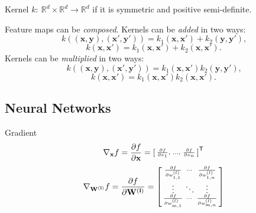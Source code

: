 \documentclass[a4paper,11pt]{article}
\def\R{\mathbb{R}}
\def\T{\mathsf{T}}
\begin{document}
\begin{mainbox}{Kernel}
    \( k: \: \R^d \times \R^d \to \R^d \) if it is symmetric and positive semi-definite.
\end{mainbox}
Feature maps can be \emph{composed}. Kernels can be \emph{added} in two ways: \[ k((\mathbf{x}, \mathbf{y}), (\mathbf{x'}, \mathbf{y'})) = k_1(\mathbf{x}, \mathbf{x'}) + k_2(\mathbf{y}, \mathbf{y'}) \text{,} \] \[ k(\mathbf{x}, \mathbf{x'}) = k_1(\mathbf{x}, \mathbf{x'}) + k_2(\mathbf{x}, \mathbf{x'}) \text{.} \] Kernels can be \emph{multiplied} in two ways: \[ k((\mathbf{x}, \mathbf{y}), (\mathbf{x'}, \mathbf{y'})) = k_1(\mathbf{x}, \mathbf{x'}) k_2(\mathbf{y}, \mathbf{y'}) \text{,} \] \[ k(\mathbf{x}, \mathbf{x'}) = k_1(\mathbf{x}, \mathbf{x'}) k_2(\mathbf{x}, \mathbf{x'}) \text{.} \]


\subsection*{Neural Networks}

\begin{mainbox}{Gradient}
    \[
        \nabla_\mathbf{x} f = \frac{\partial f}{\partial \mathbf{x}} = \begin{bsmallmatrix}
            \frac{\partial f}{\partial x_1}, & \dots, & \frac{\partial f}{\partial x_n}
        \end{bsmallmatrix}^\T
    \]
    \[
        \nabla_{\mathbf{W^{(l)}}} f = \frac{\partial f}{\partial \mathbf{W^{(l)}}} = \begin{bsmallmatrix}
            \frac{\partial f}{\partial w_{1, 1}^{(l)}} & \cdots & \frac{\partial f}{\partial w_{1, n}^{(l)}} \\
            \vdots & \ddots & \vdots \\
            \frac{\partial f}{\partial w_{m, 1}^{(l)}} & \cdots & \frac{\partial f}{\partial w_{m, n}^{(l)}}
        \end{bsmallmatrix}
    \]
\end{mainbox}




\end{document}
